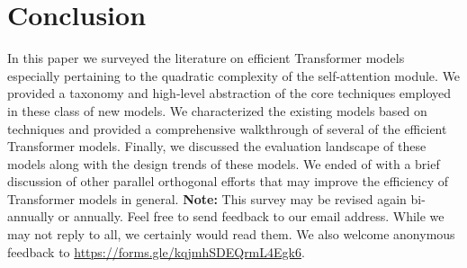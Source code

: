 \section{Conclusion}
In this paper we surveyed the literature on efficient Transformer models especially pertaining to the quadratic complexity of the self-attention module. We provided a taxonomy and high-level abstraction of the core techniques employed in these class of new models. We characterized the existing models based on techniques and provided a comprehensive walkthrough of several of the efficient Transformer models. Finally, we discussed the evaluation landscape of these models along with the design trends of these models. We ended of with a brief discussion of other parallel orthogonal efforts that may improve the efficiency of Transformer models in general. \textbf{Note:} This survey may be revised again bi-annually or annually. Feel free to send feedback to our email address. While we may not reply to all, we certainly would read them. We also welcome anonymous feedback to \url{https://forms.gle/kqjmhSDEQrmL4Egk6}.


\vskip 0.2in


